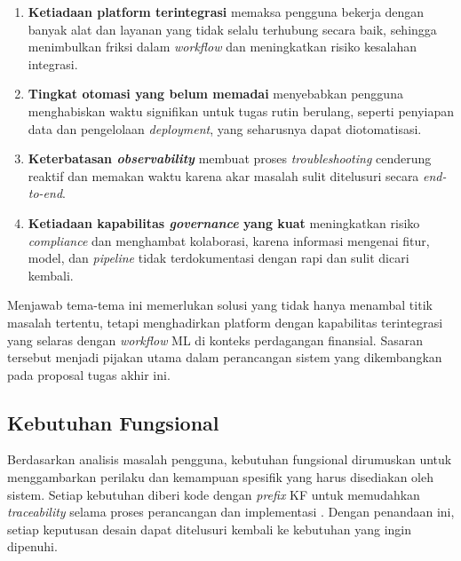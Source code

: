 \vspace{0.5em}
\begin{enumerate}
    \item \textbf{Ketiadaan platform terintegrasi} memaksa pengguna bekerja dengan banyak alat dan layanan yang tidak selalu terhubung secara baik, sehingga menimbulkan friksi dalam \textit{workflow} dan meningkatkan risiko kesalahan integrasi.

    \vspace{0.5em}
    
    \item \textbf{Tingkat otomasi yang belum memadai} menyebabkan pengguna menghabiskan waktu signifikan untuk tugas rutin berulang, seperti penyiapan data dan pengelolaan \textit{deployment}, yang seharusnya dapat diotomatisasi.

    \vspace{0.5em}

    \item \textbf{Keterbatasan \textit{observability}} membuat proses \textit{troubleshooting} cenderung reaktif dan memakan waktu karena akar masalah sulit ditelusuri secara \textit{end-to-end}.

    \vspace{0.5em}

    \item \textbf{Ketiadaan kapabilitas \textit{governance} yang kuat} meningkatkan risiko \textit{compliance} dan menghambat kolaborasi, karena informasi mengenai fitur, model, dan \textit{pipeline} tidak terdokumentasi dengan rapi dan sulit dicari kembali.

    \vspace{0.5em}
\end{enumerate}

Menjawab tema-tema ini memerlukan solusi yang tidak hanya menambal titik masalah tertentu, tetapi menghadirkan platform dengan kapabilitas terintegrasi yang selaras dengan \textit{workflow} ML di konteks perdagangan finansial. Sasaran tersebut menjadi pijakan utama dalam perancangan sistem yang dikembangkan pada proposal tugas akhir ini.

\subsection{Kebutuhan Fungsional}

Berdasarkan analisis masalah pengguna, kebutuhan fungsional dirumuskan untuk menggambarkan perilaku dan kemampuan spesifik yang harus disediakan oleh sistem. Setiap kebutuhan diberi kode dengan \textit{prefix} KF untuk memudahkan \textit{traceability} selama proses perancangan dan implementasi \autocite{sommerville2016software,lamsweerde2009requirements}. Dengan penandaan ini, setiap keputusan desain dapat ditelusuri kembali ke kebutuhan yang ingin dipenuhi.

